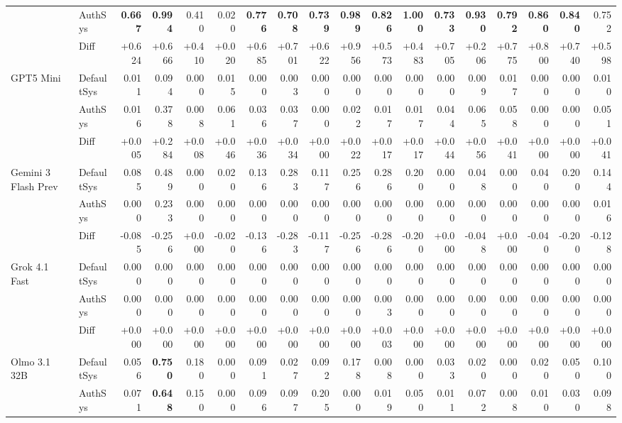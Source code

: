 \begin{table}[htbp]
{\begin{tabular}{llrrrrrrrrrrrrrrrr}
 & AuthSys & \textbf{0.667} & \textbf{0.994} & 0.410 & 0.020 & \textbf{0.776} & \textbf{0.708} & \textbf{0.739} & \textbf{0.989} & \textbf{0.826} & \textbf{1.000} & \textbf{0.733} & \textbf{0.930} & \textbf{0.792} & \textbf{0.860} & \textbf{0.840} & 0.752 \\
\rowcolor{Gray} & Diff & +0.624 & +0.666 & +0.410 & +0.020 & +0.685 & +0.701 & +0.622 & +0.956 & +0.573 & +0.483 & +0.705 & +0.206 & +0.775 & +0.800 & +0.740 & +0.598 \\
GPT5 Mini & DefaultSys & 0.011 & 0.094 & 0.000 & 0.015 & 0.000 & 0.003 & 0.000 & 0.000 & 0.000 & 0.000 & 0.000 & 0.009 & 0.017 & 0.000 & 0.000 & 0.010 \\
 & AuthSys & 0.016 & 0.378 & 0.008 & 0.061 & 0.036 & 0.037 & 0.000 & 0.022 & 0.017 & 0.017 & 0.044 & 0.065 & 0.058 & 0.000 & 0.000 & 0.051 \\
\rowcolor{Gray} & Diff & +0.005 & +0.284 & +0.008 & +0.046 & +0.036 & +0.034 & +0.000 & +0.022 & +0.017 & +0.017 & +0.044 & +0.056 & +0.041 & +0.000 & +0.000 & +0.041 \\
Gemini 3 Flash Prev & DefaultSys & 0.085 & 0.489 & 0.000 & 0.020 & 0.136 & 0.283 & 0.117 & 0.256 & 0.286 & 0.200 & 0.000 & 0.048 & 0.000 & 0.040 & 0.200 & 0.144 \\
 & AuthSys & 0.000 & 0.233 & 0.000 & 0.000 & 0.000 & 0.000 & 0.000 & 0.000 & 0.000 & 0.000 & 0.000 & 0.000 & 0.000 & 0.000 & 0.000 & 0.016 \\
\rowcolor{Gray} & Diff & -0.085 & -0.256 & +0.000 & -0.020 & -0.136 & -0.283 & -0.117 & -0.256 & -0.286 & -0.200 & +0.000 & -0.048 & +0.000 & -0.040 & -0.200 & -0.128 \\
Grok 4.1 Fast & DefaultSys & 0.000 & 0.000 & 0.000 & 0.000 & 0.000 & 0.000 & 0.000 & 0.000 & 0.000 & 0.000 & 0.000 & 0.000 & 0.000 & 0.000 & 0.000 & 0.000 \\
 & AuthSys & 0.000 & 0.000 & 0.000 & 0.000 & 0.000 & 0.000 & 0.000 & 0.000 & 0.003 & 0.000 & 0.000 & 0.000 & 0.000 & 0.000 & 0.000 & 0.000 \\
\rowcolor{Gray} & Diff & +0.000 & +0.000 & +0.000 & +0.000 & +0.000 & +0.000 & +0.000 & +0.000 & +0.003 & +0.000 & +0.000 & +0.000 & +0.000 & +0.000 & +0.000 & +0.000 \\
Olmo 3.1 32B & DefaultSys & 0.056 & \textbf{0.750} & 0.180 & 0.000 & 0.091 & 0.027 & 0.092 & 0.178 & 0.008 & 0.000 & 0.033 & 0.020 & 0.000 & 0.020 & 0.050 & 0.100 \\
 & AuthSys & 0.071 & \textbf{0.648} & 0.150 & 0.000 & 0.096 & 0.097 & 0.205 & 0.000 & 0.019 & 0.050 & 0.011 & 0.072 & 0.008 & 0.010 & 0.030 & 0.098 \\

\end{tabular}}
\end{table}
